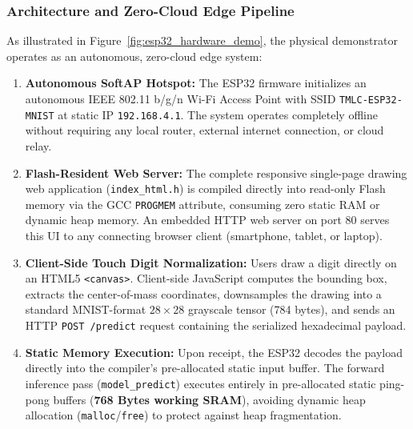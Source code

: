 \documentclass[11pt,a4paper]{article}
\begin{document}
\subsubsection{Architecture and Zero-Cloud Edge Pipeline}
As illustrated in Figure~\ref{fig:esp32_hardware_demo}, the physical demonstrator operates as an autonomous, zero-cloud edge system:
\begin{enumerate}
    \item \textbf{Autonomous SoftAP Hotspot:} The ESP32 firmware initializes an autonomous IEEE 802.11 b/g/n Wi-Fi Access Point with SSID \texttt{TMLC-ESP32-MNIST} at static IP \texttt{192.168.4.1}. The system operates completely offline without requiring any local router, external internet connection, or cloud relay.
    \item \textbf{Flash-Resident Web Server:} The complete responsive single-page drawing web application (\texttt{index\_html.h}) is compiled directly into read-only Flash memory via the GCC \texttt{PROGMEM} attribute, consuming zero static RAM or dynamic heap memory. An embedded HTTP web server on port 80 serves this UI to any connecting browser client (smartphone, tablet, or laptop).
    \item \textbf{Client-Side Touch Digit Normalization:} Users draw a digit directly on an HTML5 \texttt{<canvas>}. Client-side JavaScript computes the bounding box, extracts the center-of-mass coordinates, downsamples the drawing into a standard MNIST-format $28 \times 28$ grayscale tensor (784 bytes), and sends an HTTP \texttt{POST /predict} request containing the serialized hexadecimal payload.
    \item \textbf{Static Memory Execution:} Upon receipt, the ESP32 decodes the payload directly into the compiler's pre-allocated static input buffer. The forward inference pass (\texttt{model\_\allowbreak predict}) executes entirely in pre-allocated static ping-pong buffers (\textbf{768 Bytes working SRAM}), avoiding dynamic heap allocation (\texttt{malloc}/\texttt{free}) to protect against heap fragmentation.
\end{enumerate}
\end{document}
